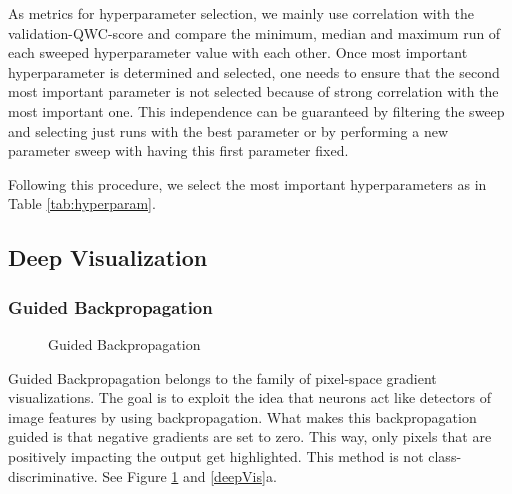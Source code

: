\documentclass{article}
\begin{document}
As metrics for hyperparameter selection, we mainly use correlation with the validation-QWC-score and 
compare the minimum, median and maximum run of each sweeped hyperparameter value with each other. 
Once most important hyperparameter is determined and selected, one needs to ensure that the second most important
parameter is not selected because of strong correlation with the most important one. This independence can be 
guaranteed by filtering the sweep and selecting just runs with the best parameter or by performing a new parameter sweep
with having this first parameter fixed.

Following this procedure, we select the most important hyperparameters as in Table \ref{tab:hyperparam}.





\subsection{Deep Visualization}
\subsubsection{Guided Backpropagation}
\begin{figure}%
  \vspace{-50pt}
  \centering
  \hspace{0.5cm}
  \caption{Guided Backpropagation}
  \label{guidedBackprop}
\end{figure}
Guided Backpropagation\cite{springenberg2015striving} belongs to the family of pixel-space gradient visualizations. 
The goal is to exploit the idea that neurons act like detectors of image features by using backpropagation.
What makes this backpropagation guided is that negative gradients are set to zero. This way, only pixels that are positively impacting 
the output get highlighted. This method is not class-discriminative. See Figure \ref{guidedBackprop} and \ref{deepVis}a.
\end{document}
